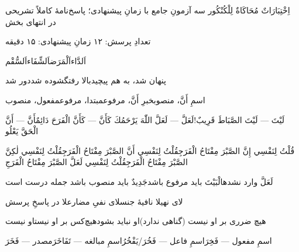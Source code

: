   {اِخْتِبَارَاتٌ مُحَاكَاةٌ لِلْكُنْكُور}
  {سه آزمونِ جامع با زمانِ پیشنهادی؛ پاسخ‌نامهٔ کاملاً تشریحی در انتهای بخش}

{\JUIFont\small\color{JMuted}تعدادِ پرسش: ۱۲ \quad\textbullet\quad زمانِ
پیشنهادی: ۱۵ دقیقه\par}
\JResetQ

{اَلدَّاء}{اَلْمَرَض}{اَلشِّفَاء}{اَلسُّقْم}

{پنهان شد، به هم پیچید}{بالا رفت}{گشوده شد}{دور شد}

{اسمِ أَنَّ، منصوب}{خبرِ أَنَّ، مرفوع}{مبتدا، مرفوع}{مفعول، منصوب}

{لَيْتَ — لَيْتَ الصَّبَاطَ قَرِيبٌ!}{لَعَلَّ — لَعَلَّ اللّٰهَ يَرْحَمُكَ}
{كَأَنَّ — كَأَنَّ الْفَرَحَ دَائِمٌ}{أَنَّ — أَنَّ الْحَقَّ يَعْلُو}

{قُلْتُ لِنَفْسِي إِنَّ الصَّبْرَ مِفْتَاحُ الْفَرَجِ}{قُلْتُ لِنَفْسِي أَنَّ
الصَّبْرَ مِفْتَاحُ الْفَرَجِ}{قُلْتُ لِنَفْسِي لٰكِنَّ الصَّبْرَ مِفْتَاحُ
الْفَرَجِ}{قُلْتُ لِنَفْسِي لَعَلَّ الصَّبْرَ مِفْتَاحُ الْفَرَجِ}

{لَعَلَّ وارد نشده}{الْبَيْتَ باید مرفوع باشد}{جَدِيدٌ باید منصوب باشد}
{جمله درست است}

{لای نهی}{لا نافیهٔ جنس}{لای نفیِ مضارع}{لا در پاسخِ پرسش}

{هیچ ضرری بر او نیست (گناهی ندارد)}{او نباید بشود}{هیچ‌کس بر او نیست}{او نیست}

{اسمِ مفعول — فَخِرَ}{اسمِ فاعل — فَخُرَ/يَفْخُرُ}{اسمِ مبالغه — تَفَاخَرَ}{مصدر — فَخَرَ}

